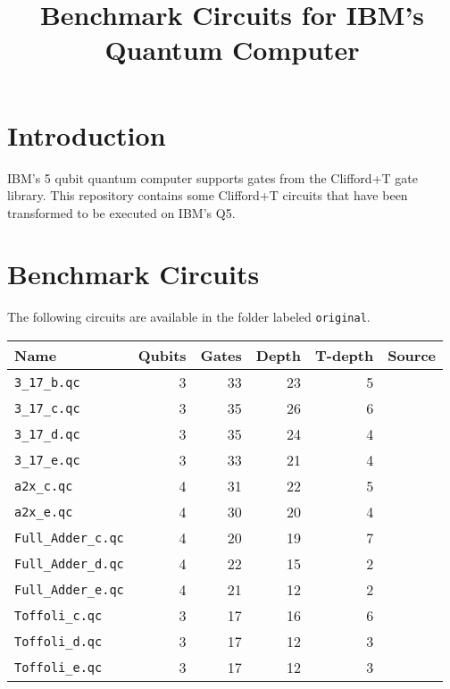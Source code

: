 \documentclass{article}
\begin{document}
\title{Benchmark Circuits for IBM's Quantum Computer}
\date{}
\maketitle

\section{Introduction}
IBM's 5 qubit quantum computer \cite{IBMQ} supports gates from the Clifford+T gate library. 
This repository contains some  Clifford+T circuits that have been transformed to be executed on IBM's Q5.

\section{Benchmark Circuits}

The following circuits are available in the folder labeled {\tt original}.
\vspace{5mm}

\begin{tabular}{|l|r|r|r|r|c|}
   \hline
   Name & Qubits & Gates & Depth & T-depth & Source \\ \hline  \hline
    {\tt 3\_17\_b.qc} & 3 & 33 & 23 & 5 & \cite{DBLP:conf/rc/MillerSD14}  \\  \hline
    {\tt 3\_17\_c.qc} & 3 & 35 & 26 & 6 & \cite{DBLP:conf/rc/MillerSD14}  \\  \hline
    {\tt 3\_17\_d.qc} & 3 & 35 & 24 & 4 & \cite{DBLP:conf/rc/MillerSD14}  \\  \hline
    {\tt 3\_17\_e.qc} & 3 & 33 & 21 & 4 & \cite{DBLP:conf/rc/MillerSD14}  \\  \hline
    {\tt a2x\_c.qc} & 4 & 31 & 22 & 5 & \cite{DBLP:conf/rc/MillerSD14}  \\  \hline
    {\tt a2x\_e.qc} & 4 & 30 & 20 & 4 & \cite{DBLP:conf/rc/MillerSD14}  \\  \hline
   {\tt Full\_Adder\_c.qc} & 4 & 20 & 19 & 7 & \cite{DBLP:conf/rc/MillerSD14}  \\  \hline
   {\tt Full\_Adder\_d.qc} & 4 & 22 & 15 & 2 & \cite{DBLP:conf/rc/MillerSD14}  \\  \hline
   {\tt Full\_Adder\_e.qc} & 4 & 21 & 12 & 2 & \cite{DBLP:conf/rc/MillerSD14}  \\  \hline
   {\tt Toffoli\_c.qc} & 3 & 17 & 16 & 6 & \cite{DBLP:conf/rc/MillerSD14}  \\  \hline
   {\tt Toffoli\_d.qc} & 3 & 17 & 12 & 3 & \cite{DBLP:conf/rc/MillerSD14}  \\  \hline
   {\tt Toffoli\_e.qc} & 3 & 17 & 12 & 3 & \cite{DBLP:conf/rc/MillerSD14}  \\  \hline
  \end{tabular} 
  \vspace{5mm}
  
\end{document}

